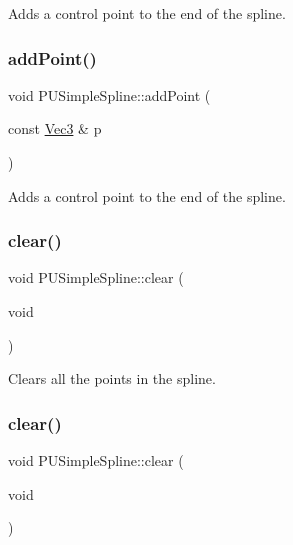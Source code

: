 Adds a control point to the end of the spline. \mbox{\label{classPUSimpleSpline_a0ddc226361cdefb81452c2ff42bd5f8f}} 
\subsubsection{\texorpdfstring{add\+Point()}{addPoint()}\hspace{0.1cm}{\footnotesize\ttfamily [2/2]}}
{\footnotesize\ttfamily void P\+U\+Simple\+Spline\+::add\+Point (\begin{DoxyParamCaption}\item[{const \hyperlink{classVec3}{Vec3} \&}]{p }\end{DoxyParamCaption})}

Adds a control point to the end of the spline. \mbox{\label{classPUSimpleSpline_a43bf47f7d4ae7687aec7eb7e202630d1}} 
\subsubsection{\texorpdfstring{clear()}{clear()}\hspace{0.1cm}{\footnotesize\ttfamily [1/2]}}
{\footnotesize\ttfamily void P\+U\+Simple\+Spline\+::clear (\begin{DoxyParamCaption}\item[{void}]{ }\end{DoxyParamCaption})}

Clears all the points in the spline. \mbox{\label{classPUSimpleSpline_a43bf47f7d4ae7687aec7eb7e202630d1}} 
\subsubsection{\texorpdfstring{clear()}{clear()}\hspace{0.1cm}{\footnotesize\ttfamily [2/2]}}
{\footnotesize\ttfamily void P\+U\+Simple\+Spline\+::clear (\begin{DoxyParamCaption}\item[{void}]{ }\end{DoxyParamCaption})}

